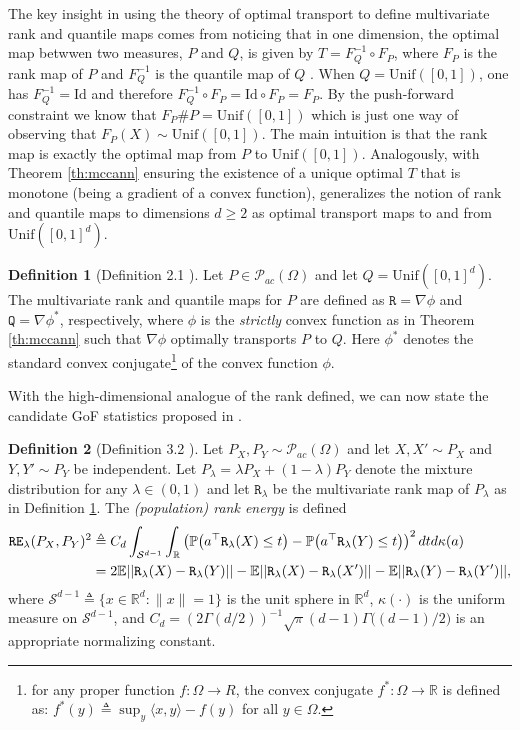 \documentclass{article}
\theoremstyle{definition}
\newtheorem{definition}{Definition}
\newcommand{\R}{\mathtt{R}_{\lambda}}
\newcommand{\RE}{\mathtt{RE}_{\lambda}}
\begin{document}
The key insight in using the theory of optimal transport to define multivariate rank and quantile maps comes from noticing that in one dimension, the optimal map betwwen two measures, $P$ and $Q$, is given by $T = F_Q^{-1} \circ F_P$, where $F_P$ is the rank map of $P$ and $F_Q^{-1}$ is the quantile map of $Q$ \cite{hallin2017distribution, hallin2021distribution,chernozhukov2017monge, deb2021multivariate}. When $Q = \text{Unif}([0,1])$, one has $F_Q^{-1} = \text{Id}$ and therefore $F_Q^{-1} \circ F_P = \text{Id} \circ F_P = F_P$. By the push-forward constraint we know that $F_P\#P = \text{Unif}([0,1])$ which is just one way of observing that $F_P(X) \sim \text{Unif}([0,1])$. The main intuition is that the rank map is exactly the optimal map from $P$ to $\text{Unif}([0,1])$. Analogously, with Theorem \ref{th:mccann} ensuring the existence of a unique optimal $T$ that is monotone (being a gradient of a convex function), \cite{deb2021multivariate} generalizes the notion of rank and quantile maps to dimensions $d\ge 2$ as optimal transport maps to and from $\text{Unif}([0,1]^d)$.  
\begin{definition}[Definition 2.1 \cite{deb2021multivariate}] \label{def:population_rank}
    Let $P\in \mathcal{P}_{ac}(\Omega)$ and let $Q = \text{Unif}([0,1]^d)$. The multivariate rank and quantile maps for $P$ are defined as $\mathtt{R} = \nabla \phi$ and $\mathtt{Q} = \nabla \phi^*$, respectively, where $\phi$ is the \emph{strictly} convex function as in Theorem \ref{th:mccann} such that $\nabla \phi$ optimally transports $P$ to $Q$. Here $\phi^*$ denotes the standard convex conjugate\footnote{for any proper function $f:\Omega\rightarrow R$, the convex conjugate $f^*:\Omega\rightarrow \mathbb R$ is defined as: $f^*(y)\triangleq \sup_{y} \langle x, y\rangle- f(y)$ for all $y\in \Omega$.} of the convex function $\phi$. 
\end{definition}
With the high-dimensional analogue of the rank defined, we can now state the candidate GoF statistics proposed in \cite{deb2021multivariate}.
\begin{definition}[Definition 3.2 \cite{deb2021multivariate}]\label{def:re}
    Let $P_X, P_Y\sim \mathcal{P}_{ac}(\Omega)$ and let $X,X' \sim P_X$ and $Y,Y'\sim P_Y$ be independent. Let $P_\lambda = \lambda P_X +(1-\lambda)P_Y$ denote the mixture distribution for any $\lambda \in (0,1)$ and let $\R$ be the multivariate rank map of $P_\lambda$ as in Definition \ref{def:population_rank}. The \textit{(population) rank energy} is defined
    \begin{align}\label{eq:population_rank}
        \RE(P_X, P_Y)^2 &\triangleq C_d \int_{\mathcal S^{d-1}}\int_{\mathbb R} \left (\mathbb P\big(a^\top \R(X)\leq t\big) - \mathbb P\big(a^\top \R(Y)\leq t\big)\right )^2 dt  d\kappa(a) \notag \\
        &= 2\mathbb{E}||\R(X) - \R(Y)|| - \mathbb{E}||\R(X) - \R(X')|| - \mathbb{E}||\R(Y) - \R(Y')||,
    \end{align}
    where $\mathcal{S}^{d-1} \triangleq \{x\in \mathbb R^d: \|x\| = 1\}$ is the unit sphere in $\mathbb{R}^d$, $\kappa(\cdot)$ is the uniform measure on $\mathcal S^{d-1}$, and $C_d = \left (2\Gamma(d/2) \right )^{-1} \sqrt{\pi}(d-1)\Gamma\big((d-1)/2\big)$ is an appropriate normalizing constant.  
\end{definition}
\end{document}
